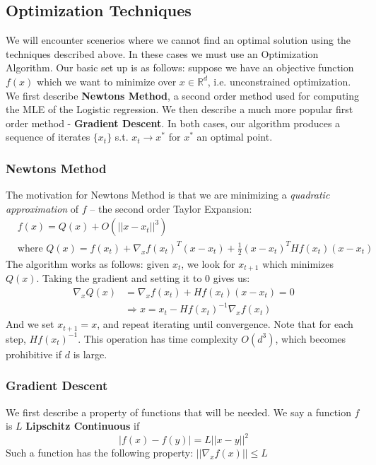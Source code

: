 \documentclass[]{article}
\theoremstyle{mattstyle}
\theoremstyle{definition}
\begin{document}
\subsection{Optimization Techniques}

We will encounter scenerios where we cannot find an optimal solution using the techniques described above. In these cases we must use an Optimization Algorithm. Our basic set up is as follows: suppose we have an objective function $f(x)$ which we want to minimize over $x\in\mathbb{R}^d$, i.e. unconstrained optimization. We first describe \textbf{Newtons Method}, a second order method used for computing the MLE of the Logistic regression. We then describe a much more popular first order method - \textbf{Gradient Descent}. In both cases, our algorithm produces a sequence of iterates $\{x_t\}$ s.t. $x_t \rightarrow x^*$ for $x^*$ an optimal point.

\subsubsection{Newtons Method}

The motivation for Newtons Method is that we are minimizing a \emph{quadratic approximation} of $f$ -- the second order Taylor Expansion: 
\begin{align*}
&f(x)=Q(x)+O(||x-x_t||^3)\\
&\text{where }Q(x)=f(x_t)+\nabla_x f(x_t)^T(x-x_t)+\frac{1}{2}(x-x_t)^THf(x_t)(x-x_t)
\end{align*}
The algorithm works as follows: given $x_t$, we look for $x_{t+1}$ which minimizes $Q(x)$. Taking the gradient and setting it to $0$ gives us:
\begin{align*}
\nabla_x Q(x)&=\nabla_x f(x_t)+Hf(x_t)(x-x_t)=0\\
&\Rightarrow x = x_t - Hf(x_t)^{-1}\nabla_x f(x_t)
\end{align*}
And we set $x_{t+1}=x$, and repeat iterating until convergence. Note that for each step, $Hf(x_t)^{-1}$. This operation has time complexity $O(d^3)$, which becomes prohibitive if $d$ is large.

\newpage

\subsubsection{Gradient Descent}

We first describe a property of functions that will be needed. We say a function $f$ is $L$ \textbf{Lipschitz Continuous} if $$|f(x)-f(y)|=L||x-y||^2$$
Such a function has the following property: $||\nabla_xf(x)||\le L$
\end{document}

